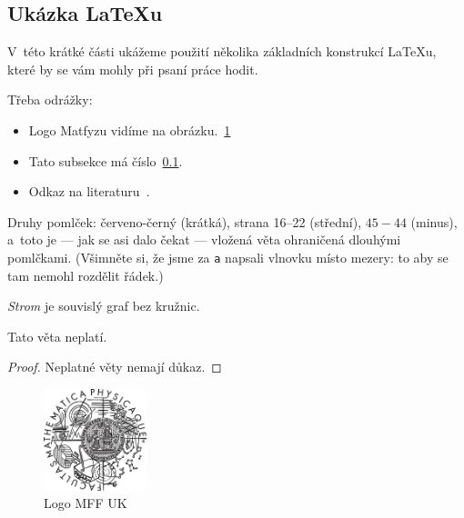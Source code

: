 
\subsection{Ukázka \LaTeX{}u}
\label{ssec:ukazka}

V~této krátké části ukážeme použití několika základních konstrukcí \LaTeX{}u,
které by se vám mohly při psaní práce hodit.

Třeba odrážky:

\begin{itemize}
\item Logo Matfyzu vidíme na obrázku.~\ref{fig:mff}
\item Tato subsekce má číslo~\ref{ssec:ukazka}.
\item Odkaz na literaturu~\cite{lamport94}.
\end{itemize}

Druhy pomlček:
červeno-černý (krátká),
strana 16--22 (střední),
$45-44$ (minus),
a~toto je --- jak se asi dalo čekat --- vložená věta ohraničená dlouhými pomlčkami.
(Všimněte si, že jsme za \verb|a| napsali vlnovku místo mezery: to aby se
tam nemohl rozdělit řádek.)



\begin{define}
{\sl Strom} je souvislý graf bez kružnic.
\end{define}


\begin{theorem}
Tato věta neplatí.
\end{theorem}


\begin{proof}
Neplatné věty nemají důkaz.
\end{proof}

\cite{cfsimpl}


\begin{figure}
	\centering
	\includegraphics[width=30mm]{./img/logo.eps}
	\caption{Logo MFF UK}
	\label{fig:mff}
\end{figure}

